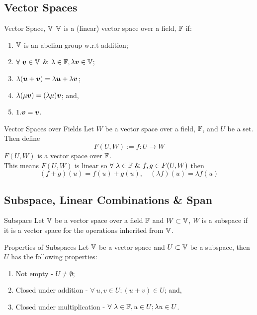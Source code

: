 \documentclass[11pt,a4paper]{article}
\begin{document}
\subsection{Vector Spaces}

\subtitle{Definition 7.07 - }{Vector Space, $\mathbb{V}$}
$\mathbb{V}$ is a (linear) vector space over a field, $\mathbb{F}$ if:
\begin{enumerate}[label=\roman*)]
  \item $\mathbb{V}$ is an abelian group w.r.t addition;
  \item $\forall\ \boldsymbol{v} \in \mathbb{V}$ \& $\lambda \in \mathbb{F}, \lambda\boldsymbol{v} \in \mathbb{V}$;
  \item $\lambda(\boldsymbol{u} + \boldsymbol{v}) = \lambda\boldsymbol{u} + \lambda\boldsymbol{v}$;
  \item $\lambda(\mu\boldsymbol{v}) = (\lambda\mu)\boldsymbol{v}$; and,
  \item $1.\boldsymbol{v} = \boldsymbol{v}$.
\end{enumerate}

\subtitle{Theorem 7.08 - }{Vector Spaces over Fields}
Let $W$ be a vector space over a field, $\mathbb{F}$, and $U$ be a set. Then define
$$F(U, W) := {f : U \to W}$$
$F(U, W)$ is a vector space over $\mathbb{F}$.\\
This means $F(U, W)$ is linear so $\forall\ \lambda \in \field\ \&\ f, g \in F(U, W)$ then
$$(f + g)(u) = f(u) + g(u),\quad (\lambda f)(u) = \lambda f(u)$$

\subsection{Subspace, Linear Combinations \& Span}

\subtitle{Definition 7.09 - }{Subspace}
Let $\mathbb{V}$ be a vector space over a field $\mathbb{F}$ and $W \subset \mathbb{V}$, $W$ is a subspace if it is a vector space for the operations inherited from $\mathbb{V}$.\\

\subtitle{Theorem 7.10 - }{Properties of Subspaces}
Let $\mathbb{V}$ be a vector space and $U \subset \mathbb{V}$ be a subspace, then $U$ has the following properties:
\begin{enumerate}[label=\roman*)]
  \item Not empty - $U \not = \emptyset$;
  \item Closed under addition - $\forall\ u, v \in U; (u + v) \in U$; and,
  \item Closed under multiplication - $\forall\ \lambda \in \field, u \in U; \lambda u \in U$.
\end{enumerate}
\end{document}
